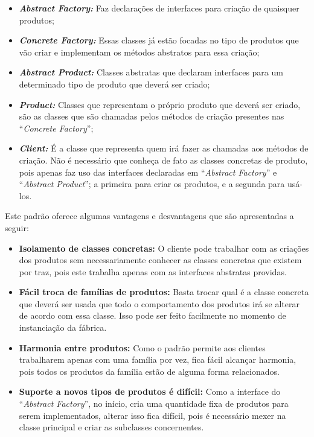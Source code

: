 \begin{itemize}
	\item \textbf{\textit{Abstract Factory:}} Faz declarações de interfaces para criação de quaisquer produtos;
	\item \textbf{\textit{Concrete Factory:}} Essas classes já estão focadas no tipo de produtos que vão criar e implementam os métodos abstratos para essa criação;
	\item \textbf{\textit{Abstract Product:}} Classes abstratas que declaram interfaces para um determinado tipo de produto que deverá ser criado;
	\item \textbf{\textit{Product:}} Classes que representam o próprio produto que deverá ser criado, são as classes que são chamadas pelos métodos de criação presentes nas ``\textit{Concrete Factory}'';
	\item \textbf{\textit{Client:}} É a classe que representa quem irá fazer as chamadas aos métodos de criação. Não é necessário que conheça de fato as classes concretas de produto, pois apenas faz uso das interfaces declaradas em ``\textit{Abstract Factory}'' e ``\textit{Abstract Product}''; a primeira para criar os produtos, e a segunda para usá-los.
\end{itemize}

Este padrão oferece algumas vantagens e desvantagens que são apresentadas a seguir:

\begin{itemize}
	\item \textbf{Isolamento de classes concretas:} O cliente pode trabalhar com as criações dos produtos sem necessariamente conhecer as classes concretas que existem por traz, pois este trabalha apenas com as interfaces abstratas providas.
	\item \textbf{Fácil troca de famílias de produtos:} Basta trocar qual é a classe concreta que deverá ser usada que todo o comportamento dos produtos irá se alterar de acordo com essa classe. Isso pode ser feito facilmente no momento de instanciação da fábrica.
	\item \textbf{Harmonia entre produtos:} Como o padrão permite aos clientes trabalharem apenas com uma família por vez, fica fácil alcançar harmonia, pois todos os produtos da família estão de alguma forma relacionados.
	\item \textbf{Suporte a novos tipos de produtos é difícil:} Como a interface do ``\textit{Abstract Factory}'', no início, cria uma quantidade fixa de produtos para serem implementados, alterar isso fica difícil, pois é necessário mexer na classe principal e criar as subclasses concernentes.
\end{itemize}

